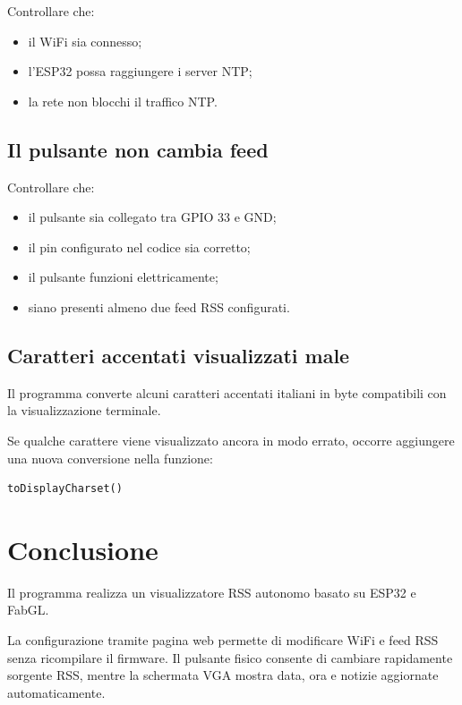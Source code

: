\documentclass[11pt,a4paper]{article}
\begin{document}
	Controllare che:
	
	\begin{itemize}
		\item il WiFi sia connesso;
		\item l'ESP32 possa raggiungere i server NTP;
		\item la rete non blocchi il traffico NTP.
	\end{itemize}
	
	\subsection{Il pulsante non cambia feed}
	
	Controllare che:
	
	\begin{itemize}
		\item il pulsante sia collegato tra GPIO 33 e GND;
		\item il pin configurato nel codice sia corretto;
		\item il pulsante funzioni elettricamente;
		\item siano presenti almeno due feed RSS configurati.
	\end{itemize}
	
	\subsection{Caratteri accentati visualizzati male}
	
	Il programma converte alcuni caratteri accentati italiani in byte compatibili con la visualizzazione terminale.
	
	Se qualche carattere viene visualizzato ancora in modo errato, occorre aggiungere una nuova conversione nella funzione:
	
	\begin{lstlisting}[style=codice]
		toDisplayCharset()
	\end{lstlisting}
	
	\section{Conclusione}
	
	Il programma realizza un visualizzatore RSS autonomo basato su ESP32 e FabGL.
	
	La configurazione tramite pagina web permette di modificare WiFi e feed RSS senza ricompilare il firmware. Il pulsante fisico consente di cambiare rapidamente sorgente RSS, mentre la schermata VGA mostra data, ora e notizie aggiornate automaticamente.
\end{document}
